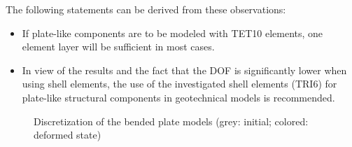 The following statements can be derived from these observations:
\begin{itemize}
    \item If plate-like components are to be modeled with TET10 elements, one element
          layer will be sufficient in most cases.
    \item In view of the results and the fact that the DOF is significantly lower when
          using shell elements, the use of the investigated shell elements (TRI6) for
          plate-like structural components in geotechnical models is recommended.
\end{itemize}

\begin{figure}[htbp]
    \centering
    \caption{Discretization of the bended plate models (grey: initial; colored: deformed state)}
    \label{bended-plate:fig:discretization}
\end{figure}

